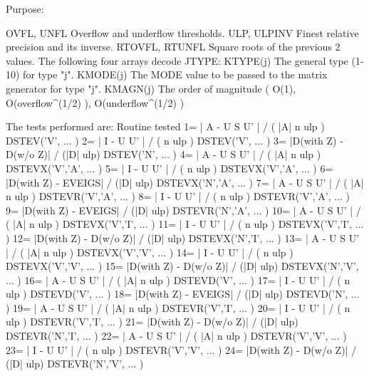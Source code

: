 \begin{DoxyParagraph}{Purpose\+: }
\begin{DoxyVerb}
       OVFL, UNFL      Overflow and underflow thresholds.
       ULP, ULPINV     Finest relative precision and its inverse.
       RTOVFL, RTUNFL  Square roots of the previous 2 values.
               The following four arrays decode JTYPE:
       KTYPE(j)        The general type (1-10) for type "j".
       KMODE(j)        The MODE value to be passed to the matrix
                       generator for type "j".
       KMAGN(j)        The order of magnitude ( O(1),
                       O(overflow^(1/2) ), O(underflow^(1/2) )

     The tests performed are:                 Routine tested
    1= | A - U S U' | / ( |A| n ulp )         DSTEV('V', ... )
    2= | I - U U' | / ( n ulp )               DSTEV('V', ... )
    3= |D(with Z) - D(w/o Z)| / (|D| ulp)     DSTEV('N', ... )
    4= | A - U S U' | / ( |A| n ulp )         DSTEVX('V','A', ... )
    5= | I - U U' | / ( n ulp )               DSTEVX('V','A', ... )
    6= |D(with Z) - EVEIGS| / (|D| ulp)       DSTEVX('N','A', ... )
    7= | A - U S U' | / ( |A| n ulp )         DSTEVR('V','A', ... )
    8= | I - U U' | / ( n ulp )               DSTEVR('V','A', ... )
    9= |D(with Z) - EVEIGS| / (|D| ulp)       DSTEVR('N','A', ... )
    10= | A - U S U' | / ( |A| n ulp )        DSTEVX('V','I', ... )
    11= | I - U U' | / ( n ulp )              DSTEVX('V','I', ... )
    12= |D(with Z) - D(w/o Z)| / (|D| ulp)    DSTEVX('N','I', ... )
    13= | A - U S U' | / ( |A| n ulp )        DSTEVX('V','V', ... )
    14= | I - U U' | / ( n ulp )              DSTEVX('V','V', ... )
    15= |D(with Z) - D(w/o Z)| / (|D| ulp)    DSTEVX('N','V', ... )
    16= | A - U S U' | / ( |A| n ulp )        DSTEVD('V', ... )
    17= | I - U U' | / ( n ulp )              DSTEVD('V', ... )
    18= |D(with Z) - EVEIGS| / (|D| ulp)      DSTEVD('N', ... )
    19= | A - U S U' | / ( |A| n ulp )        DSTEVR('V','I', ... )
    20= | I - U U' | / ( n ulp )              DSTEVR('V','I', ... )
    21= |D(with Z) - D(w/o Z)| / (|D| ulp)    DSTEVR('N','I', ... )
    22= | A - U S U' | / ( |A| n ulp )        DSTEVR('V','V', ... )
    23= | I - U U' | / ( n ulp )              DSTEVR('V','V', ... )
    24= |D(with Z) - D(w/o Z)| / (|D| ulp)    DSTEVR('N','V', ... )


\end{DoxyVerb}
\end{DoxyParagraph}
